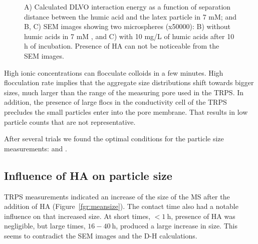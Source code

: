 \documentclass[journal=langd5,manuscript=article]{achemso}
\begin{document}
\begin{figure}
\begin{tabular}{|l|l|}
 \hline
  \end{tabular}
  \caption{A) Calculated DLVO interaction energy as a function of separation distance between the humic acid and the latex particle in  7 mM; and B, C) SEM images showing two microspheres (x50000): B) without humic acids in 7 mM , and C)  with 10 mg/L of humic acids after 10 h of incubation. Presence of HA can not be noticeable from the SEM images.} 
% 
% 
% 
  \label{fgr:SEM_50000X}
\end{figure}




High ionic concentrations can flocculate colloids in a few minutes. High flocculation rate implies that the aggregate size distributions shift towards bigger sizes, much larger than the range of the measuring pore used in the TRPS. In addition, the presence of large flocs in the conductivity cell of the TRPS precludes the small particles enter into the pore membrane. That results in low particle counts that are not representative.

After several trials we found the optimal conditions for the particle size measurements:   and .







\subsection{Influence of HA on particle size}

TRPS measurements indicated an increase of the size of the MS after the addition of HA (Figure~\ref{fgr:meansize}). The contact time also had a notable influence on that increased size. At short times, $< 1~\mathrm{h}$, presence of HA was negligible, but large times, $16 - 40~\mathrm{h}$, produced a large increase in size. This seems to contradict the SEM images and the D-H calculations.
\end{document}
